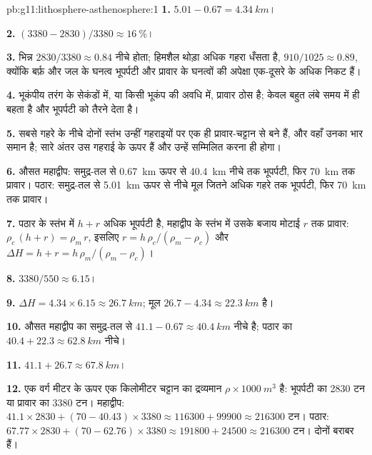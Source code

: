 \begin{solution}{pb:g11:lithosphere-asthenosphere:1}
\textbf{1.} $5.01 - 0.67 = \qty{4.34}{km}$।

\textbf{2.} $(3380 - 2830)/3380 \approx \qty{16}{\percent}$।

\textbf{3.} भिन्न $2830/3380 \approx 0.84$ नीचे होता;
हिमशैल थोड़ा अधिक गहरा धँसता है, $910/1025 \approx 0.89$, क्योंकि बर्फ़ और जल के घनत्व
भूपर्पटी और प्रावार के घनत्वों की अपेक्षा एक-दूसरे के अधिक निकट हैं।

\textbf{4.} भूकंपीय तरंग के सेकंडों में, या किसी भूकंप की अवधि में,
प्रावार ठोस है; केवल बहुत लंबे समय में ही
 बहता है और भूपर्पटी को तैरने देता है।

\textbf{5.} सबसे गहरे  के नीचे दोनों स्तंभ उन्हीं गहराइयों पर एक ही प्रावार-चट्टान
से बने हैं, और वहाँ उनका भार समान है; सारे अंतर
उस गहराई के ऊपर हैं और उन्हें सम्मिलित करना ही होगा।

\textbf{6.} औसत महाद्वीप: समुद्र-तल से \qty{0.67}{km} ऊपर से
\qty{40.4}{km} नीचे तक भूपर्पटी, फिर \qty{70}{km} तक प्रावार।
पठार: समुद्र-तल से \qty{5.01}{km} ऊपर से नीचे मूल जितने अधिक गहरे
 तक भूपर्पटी, फिर \qty{70}{km} तक प्रावार।

\textbf{7.} पठार के स्तंभ में $h + r$ अधिक भूपर्पटी है, महाद्वीप के स्तंभ में
उसके बजाय मोटाई $r$ तक प्रावार: $\rho_c\,(h + r) = \rho_m\,r$,
इसलिए $r = h\,\rho_c/(\rho_m - \rho_c)$ और $\Delta H = h + r =
h\,\rho_m/(\rho_m - \rho_c)$।

\textbf{8.} $3380/550 \approx 6.15$।

\textbf{9.} $\Delta H = 4.34 \times 6.15 \approx \qty{26.7}{km}$; मूल
$26.7 - 4.34 \approx \qty{22.3}{km}$ है।

\textbf{10.} औसत महाद्वीप का  समुद्र-तल से $41.1 - 0.67 \approx
\qty{40.4}{km}$ नीचे है; पठार का $40.4 + 22.3 \approx
\qty{62.8}{km}$ नीचे।

\textbf{11.} $41.1 + 26.7 \approx \qty{67.8}{km}$।

\textbf{12.} एक वर्ग मीटर के ऊपर एक किलोमीटर चट्टान का द्रव्यमान
$\rho \times \qty{1000}{m^3}$ है: भूपर्पटी का \num{2830} टन या प्रावार का \num{3380}
टन। महाद्वीप: $41.1 \times 2830 + (70 - 40.43) \times 3380
\approx \num{116300} + \num{99900} \approx \num{216300}$ टन। पठार:
$67.77 \times 2830 + (70 - 62.76) \times 3380 \approx \num{191800} +
\num{24500} \approx \num{216300}$ टन। दोनों बराबर हैं।


\end{solution}

